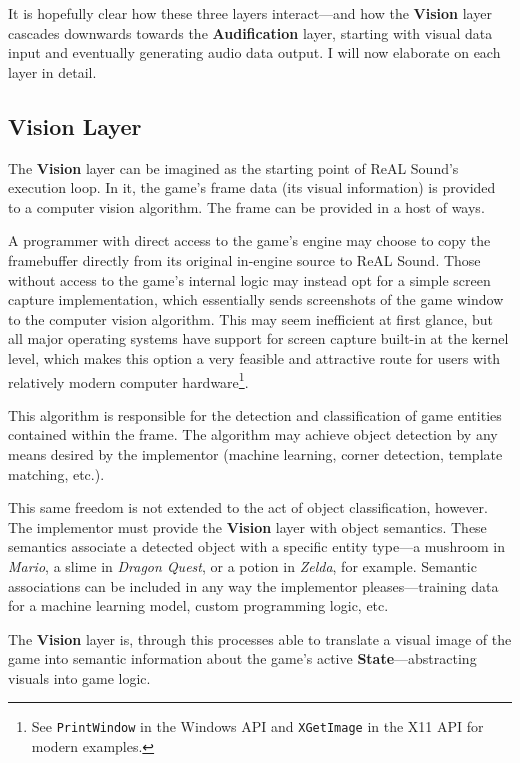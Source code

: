 \documentclass{report}
\newcommand{\rs}{ReAL Sound\xspace}
\newcommand{\state}[1]{\textbf{#1}}
\newcommand{\vision}{\textbf{Vision}\xspace}
\newcommand{\audio}{\textbf{Audification}\xspace}
\begin{document}
It is hopefully clear how these three layers interact---and how the \vision layer cascades downwards towards the \audio layer, starting with visual data input and eventually generating audio data output. I will now elaborate on each layer in detail. 

\subsection{Vision Layer}

The \vision layer can be imagined as the starting point of \rs's execution loop. In it, the game's frame data (its visual information) is provided to a computer vision algorithm. The frame can be provided in a host of ways. 

A programmer with direct access to the game's engine may choose to copy the framebuffer directly from its original in-engine source to \rs. Those without access to the game's internal logic may instead opt for a simple screen capture implementation, which essentially sends screenshots of the game window to the computer vision algorithm. This may seem inefficient at first glance, but all major operating systems have support for screen capture built-in at the kernel level, which makes this option a very feasible and attractive route for users with relatively modern computer hardware\footnote{See \texttt{PrintWindow} in the Windows API\cite{PrintWindow} and \texttt{XGetImage} in the X11 API\cite{XGetWindow} for modern examples.}. 

This algorithm is responsible for the detection and classification of game entities contained within the frame. The algorithm may achieve object detection by any means desired by the implementor (machine learning, corner detection, template matching, etc.). 

This same freedom is not extended to the act of object classification, however. The implementor must provide the \vision layer with object semantics. These semantics associate a detected object with a specific entity type---a mushroom in \emph{Mario}, a slime in \emph{Dragon Quest}, or a potion in \emph{Zelda}, for example. Semantic associations can be included in any way the implementor pleases---training data for a machine learning model, custom programming logic, etc. 

The \vision layer is, through this processes able to translate a visual image of the game into semantic information about the game's active \state{State}---abstracting visuals into game logic. 
\end{document}
